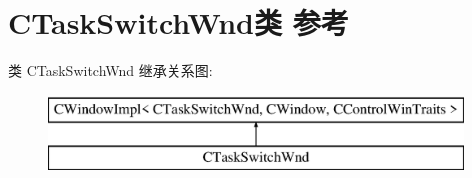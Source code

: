 \hypertarget{class_c_task_switch_wnd}{}\section{C\+Task\+Switch\+Wnd类 参考}
\label{class_c_task_switch_wnd}
类 C\+Task\+Switch\+Wnd 继承关系图\+:\begin{figure}[H]
\begin{center}
\leavevmode
\includegraphics[height=2.000000cm]{class_c_task_switch_wnd}
\end{center}
\end{figure}
